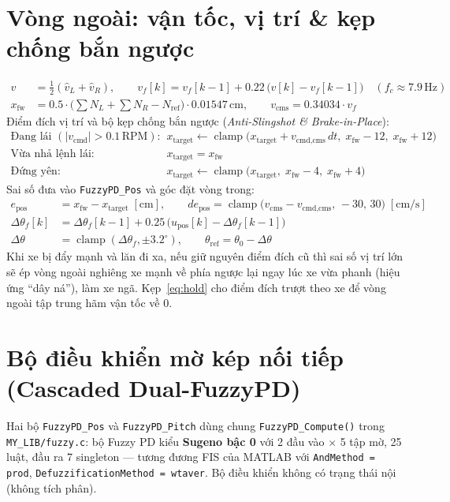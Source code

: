 \documentclass[10pt,a4paper]{article}
\newcommand{\clamp}{\operatorname{clamp}}
\begin{document}
\section{Vòng ngoài: vận tốc, vị trí \& kẹp chống bắn ngược}
\begin{align}
v &= \tfrac{1}{2}(\hat{v}_L + \hat{v}_R), \qquad v_f[k] = v_f[k-1] + 0.22\,\big(v[k] - v_f[k-1]\big) \quad (f_c \approx 7.9\,\text{Hz}) \\
x_{\text{fw}} &= 0.5 \cdot \big(\textstyle\sum N_L + \sum N_R - N_{\text{ref}}\big) \cdot 0.01547\,\text{cm}, \qquad v_{\text{cms}} = 0.34034 \cdot v_f
\end{align}
Điểm đích vị trí và bộ kẹp chống bắn ngược (\textit{Anti-Slingshot \& Brake-in-Place}):
\begin{align}
\text{Đang lái } (|v_{\text{cmd}}| > 0.1\,\text{RPM}):&\quad x_{\text{target}} \leftarrow \clamp\big(x_{\text{target}} + v_{\text{cmd,cms}}\, dt,\; x_{\text{fw}} - 12,\; x_{\text{fw}} + 12\big) \\
\text{Vừa nhả lệnh lái}:&\quad x_{\text{target}} = x_{\text{fw}} \\
\text{Đứng yên}:&\quad x_{\text{target}} \leftarrow \clamp\big(x_{\text{target}},\; x_{\text{fw}} - 4,\; x_{\text{fw}} + 4\big) \label{eq:hold}
\end{align}
Sai số đưa vào \texttt{FuzzyPD\_Pos} và góc đặt vòng trong:
\begin{align}
e_{\text{pos}} &= x_{\text{fw}} - x_{\text{target}}\;[\text{cm}], \qquad de_{\text{pos}} = \clamp\big(v_{\text{cms}} - v_{\text{cmd,cms}},\, -30,\, 30\big)\;[\text{cm/s}] \\
\Delta\theta_f[k] &= \Delta\theta_f[k-1] + 0.25\,\big(u_{\text{pos}}[k] - \Delta\theta_f[k-1]\big) \\
\Delta\theta &= \clamp(\Delta\theta_f, \pm 3.2^\circ), \qquad \theta_{\text{ref}} = \theta_0 - \Delta\theta
\end{align}
Khi xe bị đẩy mạnh và lăn đi xa, nếu giữ nguyên điểm đích cũ thì sai số vị trí lớn sẽ ép vòng ngoài nghiêng xe mạnh về phía ngược lại ngay lúc xe vừa phanh (hiệu ứng ``dây ná''), làm xe ngã. Kẹp~\eqref{eq:hold} cho điểm đích trượt theo xe để vòng ngoài tập trung hãm vận tốc về 0.

\section{Bộ điều khiển mờ kép nối tiếp (Cascaded Dual-FuzzyPD)}
Hai bộ \texttt{FuzzyPD\_Pos} và \texttt{FuzzyPD\_Pitch} dùng chung \texttt{FuzzyPD\_Compute()} trong \texttt{MY\_LIB/fuzzy.c}: bộ Fuzzy PD kiểu \textbf{Sugeno bậc 0} với 2 đầu vào $\times$ 5 tập mờ, 25 luật, đầu ra 7 singleton --- tương đương FIS của MATLAB với \texttt{AndMethod = prod}, \texttt{DefuzzificationMethod = wtaver}. Bộ điều khiển không có trạng thái nội (không tích phân).
\end{document}
